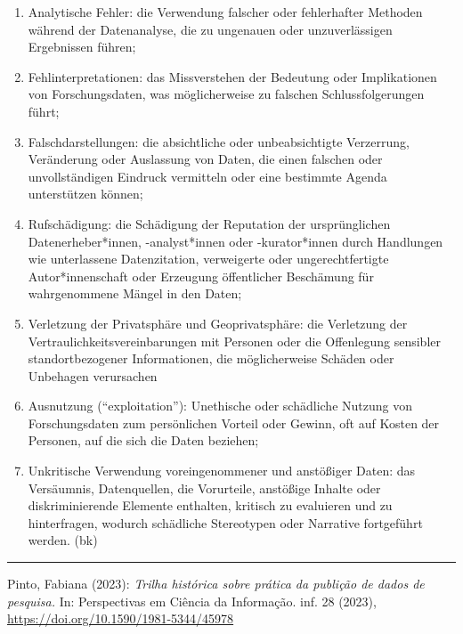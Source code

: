 \documentclass[a4paper,
fontsize=11pt,
oneside,
numbers=noperiodatend,
parskip=half-,
bibliography=totoc,
final
]{scrartcl}
\begin{document}
\begin{enumerate}
\def\labelenumi{\arabic{enumi}.}
\item
  Analytische Fehler: die Verwendung falscher oder fehlerhafter Methoden
  während der Datenanalyse, die zu ungenauen oder unzuverlässigen
  Ergebnissen führen;
\item
  Fehlinterpretationen: das Missverstehen der Bedeutung oder
  Implikationen von Forschungsdaten, was möglicherweise zu falschen
  Schlussfolgerungen führt;
\item
  Falschdarstellungen: die absichtliche oder unbeabsichtigte Verzerrung,
  Veränderung oder Auslassung von Daten, die einen falschen oder
  unvollständigen Eindruck vermitteln oder eine bestimmte Agenda
  unterstützen können;
\item
  Rufschädigung: die Schädigung der Reputation der ursprünglichen
  Datenerheber*innen, -analyst*innen oder -kurator*innen durch
  Handlungen wie unterlassene Datenzitation, verweigerte oder
  ungerechtfertigte Autor*innenschaft oder Erzeugung öffentlicher
  Beschämung für wahrgenommene Mängel in den Daten;
\item
  Verletzung der Privatsphäre und Geoprivatsphäre: die Verletzung der
  Vertraulichkeitsvereinbarungen mit Personen oder die Offenlegung
  sensibler standortbezogener Informationen, die möglicherweise Schäden
  oder Unbehagen verursachen
\item
  Ausnutzung (\enquote{exploitation}): Unethische oder schädliche
  Nutzung von Forschungsdaten zum persönlichen Vorteil oder Gewinn, oft
  auf Kosten der Personen, auf die sich die Daten beziehen;
\item
  Unkritische Verwendung voreingenommener und anstößiger Daten: das
  Versäumnis, Datenquellen, die Vorurteile, anstößige Inhalte oder
  diskriminierende Elemente enthalten, kritisch zu evaluieren und zu
  hinterfragen, wodurch schädliche Stereotypen oder Narrative
  fortgeführt werden. (bk)
\end{enumerate}

\begin{center}\rule{0.5\linewidth}{0.5pt}\end{center}

Pinto, Fabiana (2023): \emph{Trilha histórica sobre prática da publição
de dados de pesquisa.} In: Perspectivas em Ciência da Informação. inf.
28 (2023), \url{https://doi.org/10.1590/1981-5344/45978}
\end{document}
